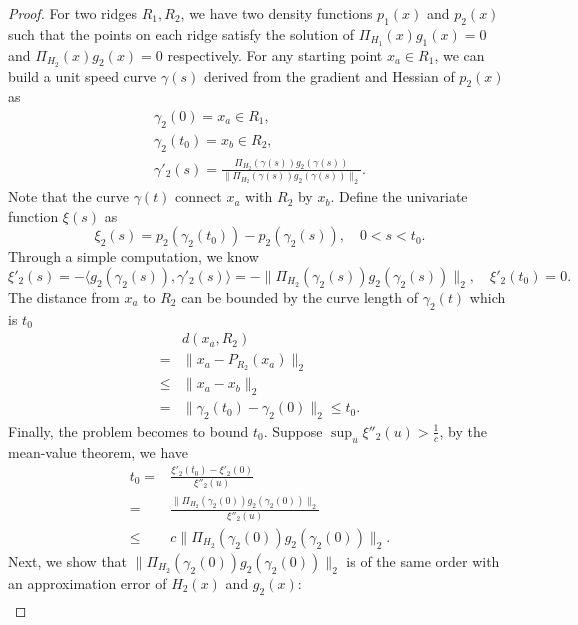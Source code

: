 \documentclass[aos,preprint]{imsart}
\theoremstyle{remark}
\begin{document}
\begin{appendix}
\begin{proof}\label{Ridge Derivative Lemma}
 For two ridges $R_1, R_2$, we have two density functions $p_1(x)$ and $p_2(x)$ such that the points on each ridge satisfy the solution of
 $\Pi_{H_1}(x) g_1(x) = 0$ 
 and $\Pi_{H_2}(x) g_2(x) = 0$ respectively. For any starting point $x_a \in R_1$, we can build a unit speed curve $\gamma(s)$ derived from the gradient and Hessian of $p_2(x)$ as
 \begin{gather*}
 \gamma_2(0) = x_a \in R_1,\\
 \gamma_2(t_0) = x_b \in R_2,\\
 \gamma'_2(s) = \frac{\Pi_{H_2}(\gamma(s))g_2(\gamma(s))}{\|\Pi_{H_2}(\gamma(s))g_2(\gamma(s))\|_2}.
 \end{gather*}
Note that the curve $\gamma(t)$ connect $x_a$ with $R_2$ by $x_b$. Define the univariate function $\xi(s)$ as
  \[
  \xi_2(s) = p_2(\gamma_2(t_0))-p_2(\gamma_2(s)), \quad 0<s<t_0.
  \]
Through a simple computation, we know 
 \[
 \xi'_2(s)=-\langle  g_2(\gamma_2(s)), \gamma'_2(s) \rangle =- \|\Pi_{H_2}(\gamma_2(s))g_2(\gamma_2(s))\|_2, \quad \xi'_2(t_0) = 0.
 \]
 The distance from $x_a$ to $R_2$ can be bounded by the curve length of $\gamma_2(t)$ which is $t_0$
 \[
 \begin{aligned}
 &d(x_a, R_2) \\
 =& \|x_a-P_{R_2}(x_a)\|_2\\
 \leq& \|x_a-x_b\|_2 \\
 = &\|\gamma_2(t_0)-\gamma_2(0)\|_2\leq t_0.
 \end{aligned}
 \]
Finally, the problem becomes to bound $t_0$. Suppose $\sup_u \xi''_2(u)>\frac{1}{c}$, by the mean-value theorem, we have
 \[
 \begin{aligned}
 t_0 = &\frac{\xi'_2(t_0)-\xi'_2(0)}{\xi''_2(u)} \\
 = &\frac{\|\Pi_{H_2}(\gamma_2(0))g_2(\gamma_2(0))\|_2}{\xi''_2(u)} \\
 \leq & c \|\Pi_{H_2}(\gamma_2(0))g_2(\gamma_2(0))\|_2.
 \end{aligned}
 \]
 Next, we show that $\|\Pi_{H_2}(\gamma_2(0))g_2(\gamma_2(0))\|_2$ is of the same order with an approximation error of $H_2(x)$ and $g_2(x)$:
 \begin{equation}
 \begin{aligned}\label{bound_temp1}

\end{aligned}
\end{equation}
\end{proof}
\end{appendix}
\end{document}
